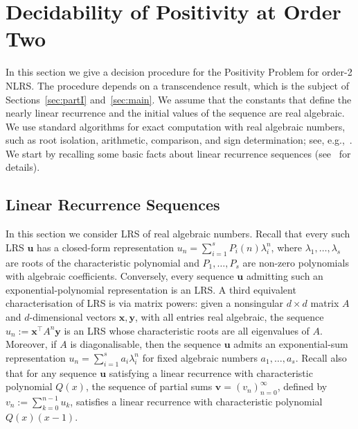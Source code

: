 \documentclass[a4paper,UKenglish,cleveref, autoref, thm-restate]{lipics-v2021}
\begin{document}
\section{Decidability of Positivity at Order Two} %
\label{sec:dec}
In this section we give a decision procedure for the Positivity
Problem for order-2 NLRS.  The procedure depends on a
transcendence result, which is the subject of Sections~\ref{sec:partI}
and~\ref{sec:main}.
We assume that the constants that define
the nearly linear recurrence and the initial values
of the sequence are real algebraic.
We use standard algorithms for exact computation with real algebraic numbers, such as root isolation, arithmetic, comparison, and sign determination; see, e.g.,~\cite{basu2006algorithms}.
We start by recalling some basic facts about
linear recurrence sequences (see~\cite[Chapter 6, Sections 1 and 2]{berstel2011noncommutative} for details).
\subsection{Linear Recurrence Sequences}
\label{sec:LRS}
In this section we consider LRS of real algebraic numbers.  Recall
that every such LRS $\boldsymbol u$ has a closed-form representation
$u_n = \sum_{i=1}^s P_i(n) \lambda_i^n$, where
$\lambda_1,\ldots,\lambda_s$ are roots of the characteristic
polynomial and $P_1,\ldots,P_s$ are non-zero polynomials with
algebraic coefficients.  Conversely, every sequence $\boldsymbol u$
admitting such an exponential-polynomial representation is an LRS.  A
third equivalent characterisation of LRS is via matrix powers: given a
nonsingular
$d\times d$ matrix $A$ and $d$-dimensional vectors
$\boldsymbol x,\boldsymbol y$, with all entries real algebraic, the
sequence $u_n:= \boldsymbol x^\top A^n \boldsymbol y$ is an LRS whose
characteristic roots are all eigenvalues of $A$.  Moreover, if $A$ is
diagonalisable, then the sequence $\boldsymbol u$ admits an
exponential-sum representation $u_n=\sum_{i=1}^s a_i \lambda_i^n$ for
fixed algebraic numbers $a_1,\ldots,a_s$.  Recall also that for any
sequence $\boldsymbol u$ satisfying a linear recurrence with
characteristic polynomial $Q(x)$, the sequence of partial sums
$\boldsymbol v=(v_n)_{n=0}^\infty$, defined by
$v_n:=\sum_{k=0}^{n-1}u_k$, satisfies a linear recurrence with
characteristic polynomial $Q(x)(x-1)$.
\end{document}
